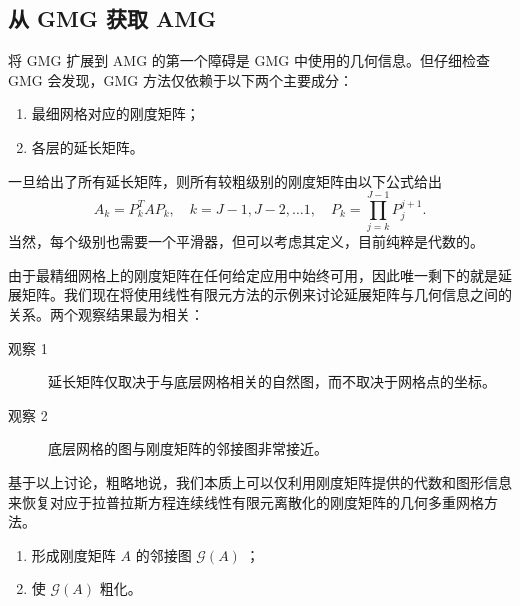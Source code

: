 \documentclass[12pt]{acta_2011xz}
\begin{document}
   \subsection{从 GMG 获取 AMG  }       \label{s:amg-from-gmg}     

将 GMG 扩展到 AMG 的第一个障碍是 GMG 中使用的几何信息。但仔细检查 GMG 会发现，GMG 方法仅依赖于以下两个主要成分：
   \begin{enumerate}[1.]

   \item   最细网格对应的刚度矩阵；   \item   各层的延长矩阵。  \end{enumerate}    一旦给出了所有延长矩阵，则所有较粗级别的刚度矩阵由以下公式给出
   \begin{equation}\label{galerkin-cgm}
A_{k}=P_{k}^TAP_{k},\quad  k=J-1, J-2, \ldots 1, \quad P_k =\prod_{j=k}^{J-1} P_{j}^{j+1}.
\end{equation}    当然，每个级别也需要一个平滑器，但可以考虑其定义，目前纯粹是代数的。  

由于最精细网格上的刚度矩阵在任何给定应用中始终可用，因此唯一剩下的就是延展矩阵。我们现在将使用线性有限元方法的示例来讨论延展矩阵与几何信息之间的关系。两个观察结果最为相关：
   \begin{description}   \item    [观察 1] 延长矩阵仅取决于与底层网格相关的自然图，而不取决于网格点的坐标。
   \item    [观察 2] 底层网格的图与刚度矩阵的邻接图非常接近。  \end{description}     

基于以上讨论，粗略地说，我们本质上可以仅利用刚度矩阵提供的代数和图形信息来恢复对应于拉普拉斯方程连续线性有限元离散化的刚度矩阵的几何多重网格方法。
   \begin{enumerate}[1.]

   \item   形成刚度矩阵    $A$    的邻接图    $\mathcal G(A)$    ；   \item   使    $\mathcal G(A)$    粗化。  \end{enumerate}     
\end{document}
